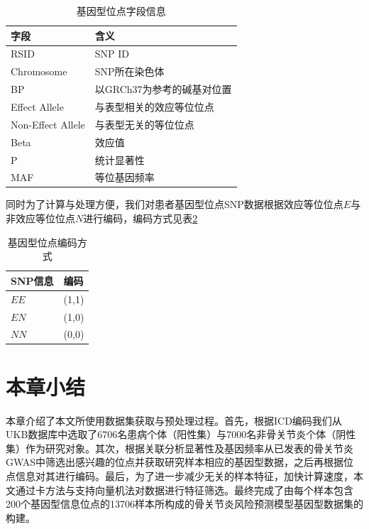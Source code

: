 \begin{table}[!h]
	\renewcommand{\arraystretch}{1.2}
	\centering\wuhao
	\caption{基因型位点字段信息} \label{SNP_traits} \vspace{2mm}
	\begin{tabularx}{\textwidth} { 
   >{\centering\arraybackslash}X 
   >{\centering\arraybackslash}X }
	\toprule[1.5pt]
		字段 & 含义                \\
	\midrule[1pt]
		RSID              & SNP ID            \\
    Chromosome        & SNP所在染色体          \\
    BP                & 以GRCh37为参考的碱基对位置  \\
    Effect Allele     & 与表型相关的效应等位位点        \\
    Non-Effect Allele & 与表型无关的等位位点        \\
    Beta              & 效应值               \\
    P                 & 统计显著性             \\
    MAF               & 等位基因频率           \\
	\bottomrule[1.5pt]
	\end{tabularx}
\end{table}

同时为了计算与处理方便，我们对患者基因型位点SNP数据根据效应等位位点$E$与非效应等位位点$N$进行编码，编码方式见表\ref{SNP_encoding}

\begin{table}[!h]
	\renewcommand{\arraystretch}{1.2}
	\centering\wuhao
	\caption{基因型位点编码方式} \label{SNP_encoding} \vspace{2mm}
	\begin{tabularx}{\textwidth} { 
   >{\centering\arraybackslash}X 
   >{\centering\arraybackslash}X }
	\toprule[1.5pt]
		SNP信息 & 编码\\
	\midrule[1pt]
	    $EE$ & (1,1) \\
	    $EN$ & (1,0) \\
	    $NN$ & (0,0) \\
	\bottomrule[1.5pt]
	\end{tabularx}
\end{table}

\section{本章小结}
本章介绍了本文所使用数据集获取与预处理过程。首先，根据ICD编码我们从UKB数据库中选取了6706名患病个体（阳性集）与7000名非骨关节炎个体（阴性集）作为研究对象。其次，根据关联分析显著性及基因频率从已发表的骨关节炎GWAS中筛选出感兴趣的位点并获取研究样本相应的基因型数据，之后再根据位点信息对其进行编码。最后，为了进一步减少无关的样本特征，加快计算速度，本文通过卡方法与支持向量机法对数据进行特征筛选。最终完成了由每个样本包含200个基因型信息位点的13706样本所构成的骨关节炎风险预测模型基因型数据集的构建。